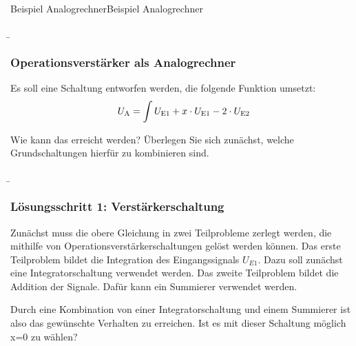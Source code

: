 \begin{frame}
{\begin{bsp}{Beispiel Analogrechner}{Beispiel Analogrechner}
    \end{bsp}


    }
	\b{\frametitle{Operationsverstärker als Analogrechner}
        Es soll eine Schaltung entworfen werden, die folgende Funktion umsetzt:
        \begin{equation}
            U_{\textnormal{A}} = \int U_{\textnormal{E1}} +x \cdot U_{\textnormal{E1}} - 2\cdot U_{\textnormal{E2}} 
        \end{equation}

        Wie kann das erreicht werden? Überlegen Sie sich zunächst, welche Grundschaltungen hierfür zu kombinieren sind. 
        }
\end{frame}

\begin{frame}
    \b{
        \frametitle{Lösungsschritt 1: Verstärkerschaltung}
        Zunächst muss die obere Gleichung in zwei Teilprobleme zerlegt werden, die mithilfe von Operationsverstärkerschaltungen gelöst werden können.
        Das erste Teilproblem bildet die Integration des Eingangssignals $U_{E1}$. Dazu soll zunächst eine Integratorschaltung verwendet werden.
        Das zweite Teilproblem bildet die Addition der Signale. Dafür kann ein Summierer verwendet werden.
        \begin{figure}[ht]
            \centering
        \end{figure}
        Durch eine Kombination von einer Integratorschaltung und einem Summierer ist also das gewünschte Verhalten zu erreichen. Ist es mit dieser Schaltung möglich x=0 zu wählen?
        }
\end{frame}

